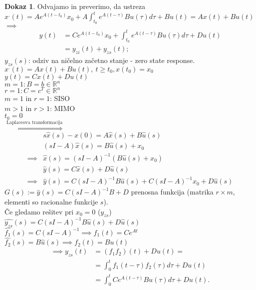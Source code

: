 \documentclass[a4paper, 12pt]{book}
\theoremstyle{definition}
\newtheorem{pro}[counter]{Dokaz}
\theoremstyle{remark}
\newcommand{\R}{\mathbb{R}}
\begin{document}
\begin{pro}
    Odvajamo in preverimo, da ustreza \\
    $x^{.}(t) = A e^{A(t-t_0)} x_0 + A \int_{t_0}^t e^{A(t-\tau)} Bu(\tau) d\tau + Bu(t) = Ax(t) + Bu(t)$ \\
    $\implies$ 
    \begin{align*}
         y(t) &= C e^{A(t-t_0)} x_0 + \int_{t_0}^t e^{A(t-\tau)} B u(\tau) d\tau + D u(t) \\
         &= y_{zi}(t) + y_{zs}(t);
    \end{align*}
    $y_{zs}(s)$: odziv na ničelno začetno stanje - zero state response.  \\
    $x^{.}(t) = A x(t) + B u(t), \: t \geq t_0, x(t_0) = x_0$ \\
    $y(t) = C x(t) + D u(t)$ \\
    $m=1: B = b \in \R^n$ \\
    $r=1: C = c^T \in \R^n$ \\
    $m=1$ in $r=1$: SISO \\
    $m>1$ in $r>1$: MIMO \\
    $t_0 = 0$ \\
    $\stackrel{\text{Laplaceova transformacija}}{\Longrightarrow}$
    \begin{align*}
        &s \hat{x}(s) - x(0) = A \hat{x}(s) + B \hat{u}(s) \\
        &(sI - A) \hat{x}(s) = B \hat{u}(s) + x_0 \\
        \implies &\hat{x}(s) = (sI - A)^{-1} (B \hat{u}(s) + x_0) \\
        &\hat{y}(s) = C \hat{x}(s) + D \hat{u}(s) \\
        \implies &\hat{y}(s) = C (sI - A)^{-1} B \hat{u}(s) + C (sI - A)^{-1} x_0 + D \hat{u}(s)
    \end{align*}
    $G(s) := \hat{y}(s) = C (sI - A)^{-1} B + D$ prenosna funkcija
    (matrika $r \times m$, elementi so racionalne funkcije $s$). \\
    Če gledamo rešitev pri $x_0 = 0$ ($y_{zs}$) \\
    $\widehat{y_{zs}}(s) = C (sI - A)^{-1} B \hat{u}(s) + D \hat{u}(s)$ \\
    $\hat{f_1}(s) = C (sI - A)^{-1} \implies f_1(t) = C e^{At}$ \\
    $\hat{f_2}(s) = B \hat{u}(s) \implies f_2(t) = B u(t)$ \\
    \begin{align*}
        \implies y_{zs}(t) &= (f_1  f_2)(t) + D u(t) = \\
        &= \int_0^t f_1(t-\tau) f_2(\tau) d\tau + D u(t) \\
        &= \int_0^t  C e^{A(t-\tau)} B u(\tau) d\tau + D u(t).
    \end{align*}
\end{pro}
\end{document}
